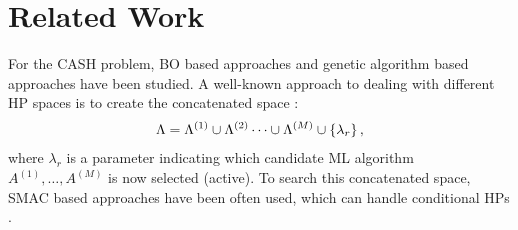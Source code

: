 \section{Related Work}
\label{sec:related_works}


For the CASH problem, BO based approaches \cite{thornton2013auto,snoek2012practical} and genetic algorithm based approaches \cite{whitley1994genetic,OlsonGECCO2016} have been studied.
%
A well-known approach to dealing with different HP spaces is to create the concatenated space 
\cite{thornton2013auto,levesque2017bayesian,feurer2015initializing,NIPS2015_11d0e628}: 
\begin{align*}
 \*{\Lambda} = \*{\Lambda}^{(1)} \cup \*{\Lambda}^{(2)} \cdots \cup \*{\Lambda}^{(M)} \cup \left\{\lambda_r\right\}, 
\end{align*}
where 
$\lambda_r$
is a parameter indicating which candidate ML algorithm $A^{(1)}, \ldots, A^{(M)}$ is now selected (active).
%
To search this concatenated space, SMAC \cite{hutter2011sequential} based approaches have been often used, which can handle conditional HPs \cite{thornton2013auto,levesque2017bayesian}.

